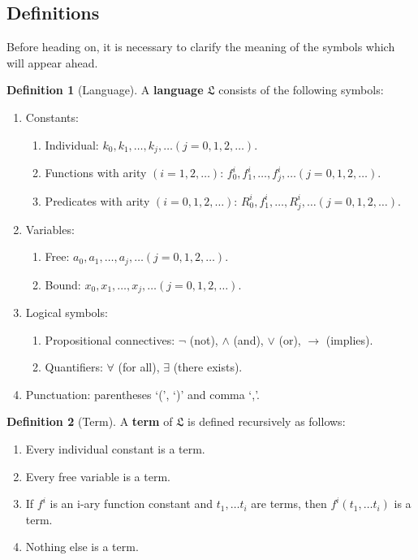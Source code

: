 \documentclass[12pt,a4paper]{article}
\theoremstyle{definition}
\newtheorem{definition}{Definition}[section]
\begin{document}
\subsection{Definitions}
\label{Definitions}

Before heading on, it is necessary to clarify the meaning of the symbols which will appear ahead.

\begin{definition}[Language]
    A \textbf{language} $\mathfrak{L}$ consists of the following symbols:
    \begin{enumerate}
        \item Constants:
            \begin{enumerate}
                \item Individual: $k_0,k_1,\ldots,k_j,\ldots (j=0,1,2,\ldots)$.
                \item Functions with arity $(i = 1,2,\ldots)$: $f_0^i, f_1^i, \ldots, f_j^i, \ldots (j=0,1,2,\ldots)$.
                \item Predicates with arity $(i = 0,1,2,\ldots)$: $R_0^i, f_1^i, \ldots, R_j^i, \ldots (j=0,1,2,\ldots)$.
            \end{enumerate}
        \item Variables:
            \begin{enumerate}
                \item Free: $a_0, a_1, \ldots, a_j, \ldots (j=0,1,2,\ldots)$.
                \item Bound: $x_0, x_1, \ldots, x_j, \ldots (j=0,1,2,\ldots)$.
            \end{enumerate}
        \item Logical symbols:
        \begin{enumerate}
            \item Propositional connectives: $\neg$ (not), $\land$ (and), $\lor$ (or), $\to$ (implies).
            \item Quantifiers: $\forall$ (for all), $\exists$ (there exists).
        \end{enumerate} 
        \item Punctuation: parentheses `(', `)' and comma `,'.
    \end{enumerate}
\end{definition}

\begin{definition}[Term]
    A \textbf{term} of $\mathfrak{L}$ is defined recursively as follows:
    \begin{enumerate}
        \item Every individual constant is a term.
        \item Every free variable is a term.
        \item If $f^i$ is an i-ary function constant and $t_1, \ldots t_i$ are terms, then $f^i(t_1, \ldots t_i)$ is a term.
        \item Nothing else is a term.
    \end{enumerate}
\end{definition}
\end{document}
